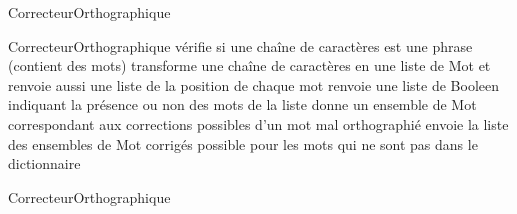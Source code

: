 \begin{tad}
	\begin{tadOperations}{CorrecteurOrthographique}
			{\tadDeuxParams{\chaine}}%
			{\tadUnParam{\booleen}}
			{\tadUnParam{\chaine}}%
			{}
			{}%
			{}
			{}%
			{}
			{}%
			{}
	\end{tadOperations}
		
	\begin{tadSemantiques}{CorrecteurOrthographique}
			{v\'erifie si une cha\^ine de caract\`eres est une phrase (contient des mots)}
			{transforme une cha\^ine de caract\`eres en une liste de Mot et renvoie aussi une liste de la position de chaque mot}
			{renvoie une liste de Booleen indiquant la présence ou non des mots de la liste}
			{donne un ensemble de Mot correspondant aux corrections possibles d’un mot mal orthographi\'e}
			{envoie la liste des ensembles de Mot corrig\'es possible pour les mots qui ne sont pas dans le dictionnaire}
	\end{tadSemantiques}
		
		
	\begin{tadPreconditions}{CorrecteurOrthographique}
			{}
	\end{tadPreconditions}
\end{tad}
